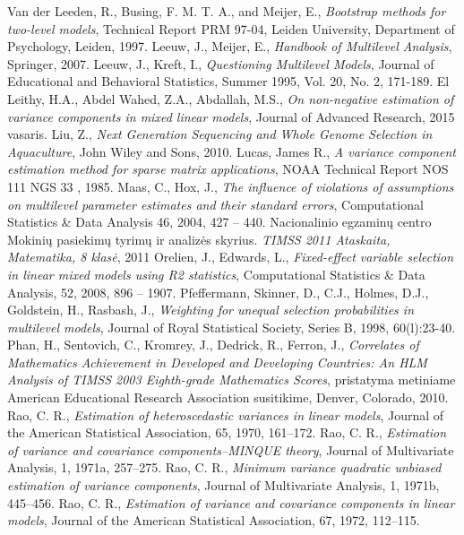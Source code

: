 \documentclass[12pt,a4paper]{article}
\begin{document}
\begin{thebibliography}{1}
 Van der Leeden, R., Busing, F. M. T. A., and Meijer, E., \textit{Bootstrap methods for two-level models}, Technical Report PRM 97-04, Leiden University, Department of Psychology, Leiden, 1997.
 Leeuw, J., Meijer, E., \textit{Handbook of Multilevel Analysis}, Springer, 2007.
 Leeuw, J., Kreft, I., \textit{Questioning Multilevel Models}, Journal of Educational and Behavioral Statistics, Summer 1995, Vol. 20, No. 2, 171-189.
 El  Leithy,  H.A.,  Abdel  Wahed,  Z.A.,  Abdallah,  M.S.,  \textit{On  non-negative  estimation  of
variance components in mixed linear models}, Journal of Advanced Research, 2015 vasaris.
 Liu, Z., \textit{Next Generation Sequencing and Whole Genome Selection in Aquaculture}, John Wiley and Sons, 2010.
Lucas, James R., \textit{A variance component estimation method for sparse matrix applications}, NOAA Technical Report NOS 111 NGS 33 , 1985.
 Maas, C., Hox, J., \textit{The influence of violations of assumptions on multilevel parameter estimates and their standard errors}, Computational Statistics \& Data Analysis 46, 2004, 427 – 440.
 Nacionalinio egzaminų centro Mokinių pasiekimų tyrimų ir analizės skyrius. \textit{TIMSS 2011 Ataskaita, Matematika, 8 klasė}, 2011
 Orelien, J., Edwards, L., \textit{Fixed-effect variable selection in linear mixed models using R2 statistics}, Computational Statistics \& Data Analysis, 52, 2008, 896 – 1907.
 Pfeffermann, Skinner, D., C.J., Holmes, D.J., Goldstein, H., Rasbash, J., \textit{Weighting for unequal selection probabilities in multilevel models}, Journal of Royal Statistical Society, Series B, 1998, 60(l):23-40.
 Phan, H., Sentovich, C., Kromrey, J., Dedrick, R., Ferron, J., \textit{Correlates of Mathematics Achievement in Developed and Developing Countries: An HLM Analysis of TIMSS 2003 Eighth-grade Mathematics Scores}, pristatyma metiniame American Educational Research Association susitikime, Denver, Colorado, 2010.
Rao, C. R., \textit{Estimation of heteroscedastic variances in linear models}, Journal of the American Statistical Association, 65, 1970, 161–172.
 Rao, C. R., \textit{Estimation of variance and covariance components–MINQUE theory}, Journal of Multivariate Analysis, 1, 1971a, 257–275.
 Rao, C. R., \textit{Minimum variance quadratic unbiased estimation of variance components}, Journal of Multivariate Analysis, 1, 1971b, 445–456.
 Rao, C. R., \textit{Estimation of variance and covariance components in linear models}, Journal of the American Statistical Association, 67, 1972, 112–115.

\end{thebibliography}
\end{document}

